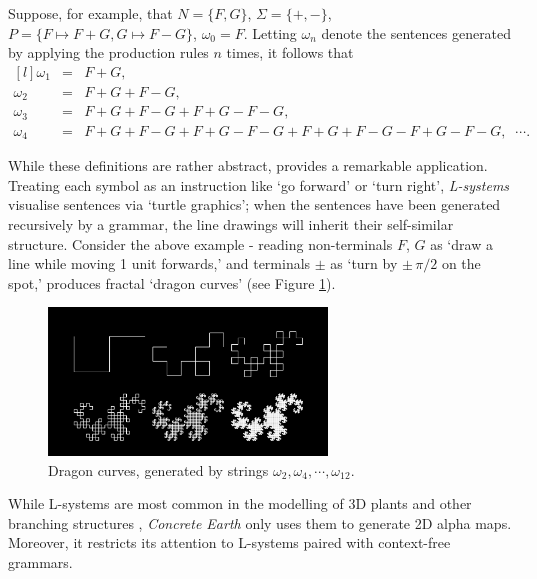 \documentclass[a4paper, 11pt]{article}
\begin{document}
\begin{flushleft}
\vspace{5pt}\noindent
Suppose, for example, that $N = \{F, G\}$, $\Sigma = \{+, -\}$, $P = \{F \mapsto F+G, G \mapsto F-G\}$, $\omega_0 = F$.
Letting $\omega_n$ denote the sentences generated by applying the production rules $n$ times, it follows that
$$\begin{matrix*}[l]
\omega_1 &= &F+G, \\
\omega_2 &= &F+G+F-G, \\
\omega_3 &= &F+G+F-G+F+G-F-G, \\
\omega_4 &= &F+G+F-G+F+G-F-G+F+G+F-G-F+G-F-G, \;\; \cdots.
\end{matrix*}$$

\vspace{5pt}\noindent
While these definitions are rather abstract, \citet{lindenmayerLSystems} provides a remarkable application. Treating each symbol as an instruction like `go forward' or `turn right', \textit{L-systems} visualise sentences via `turtle graphics'; when the sentences have been generated recursively by a grammar, the line drawings will inherit their self-similar structure. Consider the above example - reading non-terminals $F$, $G$ as `draw a line while moving 1 unit forwards,' and terminals $\pm$ as `turn by $\pm\, \pi/2$ on the spot,' produces fractal `dragon curves' (see Figure \ref{Dragon Curves}).

\vspace{5pt}\noindent
\begin{figure}[h]
\centering
\includegraphics[width=0.66\textwidth]{Dragon Curves}
\caption{Dragon curves, generated by strings $\omega_2, \omega_4, \cdots, \omega_{12}$.}
\label{Dragon Curves}
\end{figure}

\vspace{5pt}\noindent
While L-systems are most common in the modelling of 3D plants and other branching structures \citep{prusinkiewiczAlgorithmicBeauty}, \textit{Concrete Earth} only uses them to generate 2D alpha maps. Moreover, it restricts its attention to L-systems paired with context-free grammars.


\end{flushleft}
\end{document}
